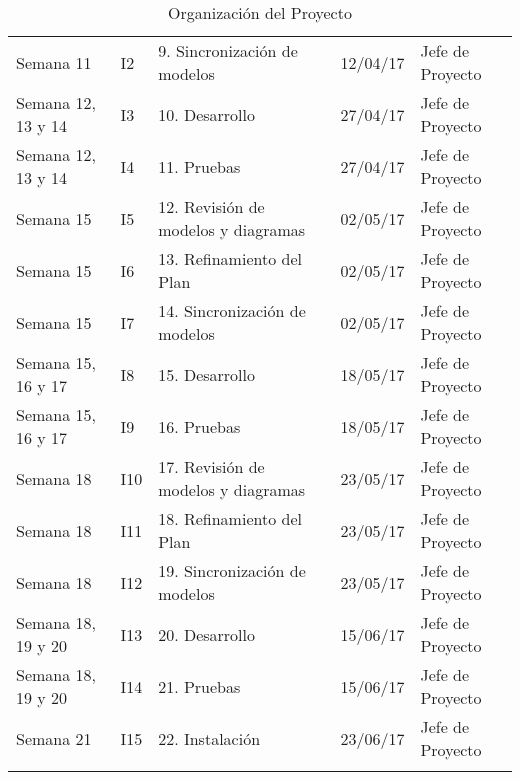 \begin{center}
\begin{longtable}{lllll}
Semana 11	&	I2	&	9. Sincronización de modelos	&	12/04/17	&	Jefe de Proyecto	\\
Semana 12, 13 y 14	&	I3	&	10. Desarrollo	&	27/04/17	&	Jefe de Proyecto	\\
Semana 12, 13 y 14	&	I4	&	11. Pruebas	&	27/04/17	&	Jefe de Proyecto	\\
Semana 15	&	I5	&	12. Revisión de modelos y diagramas 	&	02/05/17	&	Jefe de Proyecto	\\
Semana 15	&	I6	&	13. Refinamiento del Plan 	&	02/05/17	&	Jefe de Proyecto	\\
Semana 15	&	I7	&	14. Sincronización de modelos	&	02/05/17	&	Jefe de Proyecto	\\
Semana 15, 16 y 17	&	I8	&	15. Desarrollo	&	18/05/17	&	Jefe de Proyecto	\\
Semana 15, 16 y 17	&	I9	&	16. Pruebas	&	18/05/17	&	Jefe de Proyecto	\\
Semana 18	&	I10	&	17. Revisión de modelos y diagramas 	&	23/05/17	&	Jefe de Proyecto	\\
Semana 18	&	I11	&	18. Refinamiento del Plan 	&	23/05/17	&	Jefe de Proyecto	\\
Semana 18	&	I12	&	19. Sincronización de modelos	&	23/05/17	&	Jefe de Proyecto	\\
Semana 18, 19 y 20	&	I13	&	20. Desarrollo	&	15/06/17	&	Jefe de Proyecto	\\
Semana 18, 19 y 20	&	I14	&	21. Pruebas	&	15/06/17	&	Jefe de Proyecto	\\
Semana 21	&	I15	&	22. Instalación	&	23/06/17	&	Jefe de Proyecto	\\
\hline
\caption{Organización del Proyecto}
\label{tab:organizacion}
\end{longtable}
\end{center}
